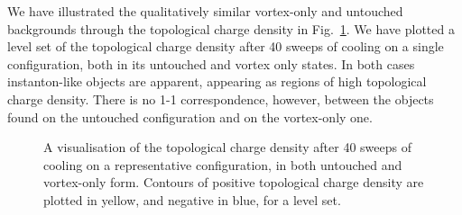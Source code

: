 \documentclass[
 reprint,
 amsmath,amssymb,
 aps,
prd,
]{revtex4-1}
\begin{document}
\par
We have illustrated the qualitatively similar vortex-only and untouched backgrounds through the topological charge density in Fig.~\ref{Fig:cool40q}. We have plotted a level set of the topological charge density after 40 sweeps of cooling on a single configuration, both in its untouched and vortex only states. In both cases instanton-like objects are apparent, appearing as regions of high topological charge density. There is no 1-1 correspondence, however, between the objects found on the untouched configuration and on the vortex-only one.

\begin{figure}[thpb]
\caption{A visualisation of the topological charge density after 40 sweeps of cooling on a representative configuration, in both untouched  and vortex-only  form. Contours of positive topological charge density are plotted in yellow, and negative in blue, for a level set.}
\label{Fig:cool40q}
\end{figure}
\end{document}
